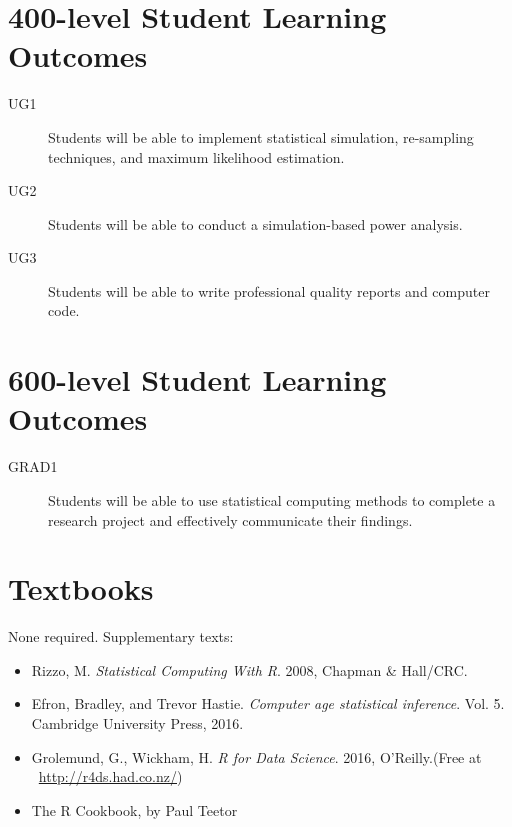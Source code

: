 \documentclass[11pt,onecolumn]{article}
\begin{document}
\section*{400-level Student Learning Outcomes}
\begin{description}
\item[UG1] Students will be able to implement statistical simulation, re-sampling techniques, and maximum likelihood estimation. 
\item[UG2] Students will be able to conduct a simulation-based power analysis. 
\item[UG3] Students will be able to write professional quality reports and computer code.
\end{description}

\section*{600-level Student Learning Outcomes}
\begin{description}
\item[GRAD1] Students will be able to use statistical computing methods to complete a research project and effectively communicate their findings.
\end{description}

\section*{Textbooks}
None required. Supplementary texts:
\begin{itemize}
  \itemsep0em
\item Rizzo, M. \emph{Statistical Computing With R}. 2008, Chapman \& Hall/CRC.
\item Efron, Bradley, and Trevor Hastie. \textit{Computer age statistical inference}. Vol. 5. Cambridge University Press, 2016.
  \item Grolemund, G., Wickham, H. \emph{R for Data Science}. 2016, O’Reilly.(Free at ~\url{http://r4ds.had.co.nz/})
\item The R Cookbook, by Paul Teetor
\end{itemize}
\end{document}
